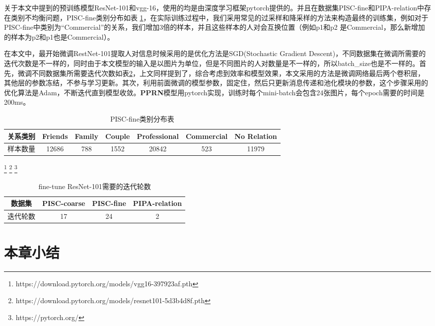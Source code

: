 关于本文中提到的预训练模型ResNet-101和vgg-16，使用的均是由深度学习框架pytorch提供的。并且在数据集PISC-fine和PIPA-relation中存在类别不均衡问题，PISC-fine类别分布如表
\ref{tab:model-pisc-cls}，在实际训练过程中，我们采用常见的过采样和降采样的方法来构造最终的训练集，例如对于PISC-fine中类别为``Commercial''的关系，我们增加3倍的样本，并且这些样本的人对会互换位置（例如p1和p2 是Commercial，那么新增加的样本为p2和p1也是Commercial）。

在本文中，最开始微调RestNet-101提取人对信息时候采用的是优化方法是SGD(Stochastic Gradient Descent)，不同数据集在微调所需要的迭代次数是不一样的，同时由于本文模型的输入是以图片为单位，但是不同图片的人对数量是不一样的，所以batch\_size也是不一样的。首先，微调不同数据集所需要迭代次数如表\ref{tab:model-ft-epoch}，上文同样提到了，综合考虑到效率和模型效果，本文采用的方法是微调网络最后两个卷积层，其他层的参数冻结，不参与学习更新。其次，利用前面微调的模型参数，固定住，然后只更新消息传递和池化模块的参数，这个步骤采用的优化算法是Adam\cite{kingma2014adam}，不断迭代直到模型收敛。\textbf{PPRN}模型用pytorch实现，训练时每个mini-batch会包含24张图片，每个epoch需要的时间是200ms。

\begin{table}[htpb]
  \centering
  \caption{PISC-fine类别分布表}
  \label{tab:model-pisc-cls}
  \begin{tabular}{c|c|c|c|c|c|c}
    \toprule
    关系类别 & Friends & Family & Couple & Professional & Commercial & No Relation \\
    \midrule
    样本数量 & 12686 & 788 & 1552 & 20842 & 523 & 11979 \\
    \bottomrule
  \end{tabular}
\end{table}

\footnote{https://download.pytorch.org/models/vgg16-397923af.pth}
\footnote{https://download.pytorch.org/models/resnet101-5d3b4d8f.pth}
\footnote{https://pytorch.org/}

\begin{table}[htpb]
  \centering
  \caption{fine-tune ResNet-101需要的迭代轮数}
  \label{tab:model-ft-epoch}
  \begin{tabular}{c|c|c|c}
    \toprule
    数据集 & PISC-coarse & PISC-fine  & PIPA-relation \\
    \midrule
    迭代轮数 & 17 & 24 & 2 \\
    \bottomrule
  \end{tabular}
\end{table}

\section{本章小结}

